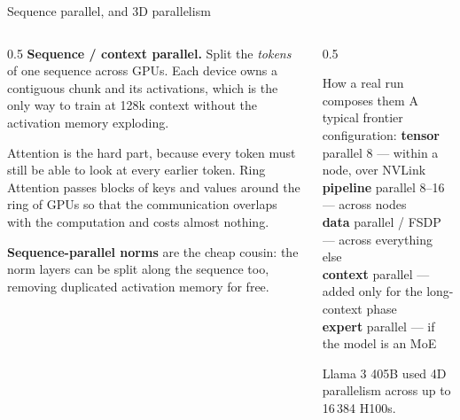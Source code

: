 \documentclass[aspectratio=169,10pt]{beamer}
\begin{document}
\begin{frame}[shrink=13]{Sequence parallel, and 3D parallelism}
  \begin{columns}[T]
    \begin{column}{0.5\textwidth}
      \textbf{Sequence / context parallel.} Split the \emph{tokens} of one
      sequence across GPUs. Each device owns a contiguous chunk and its
      activations, which is the only way to train at 128k context without the
      activation memory exploding.
      \vspace{0.4em}

      Attention is the hard part, because every token must still be able to look
      at every earlier token. Ring Attention passes blocks of keys and values
      around the ring of GPUs so that the communication overlaps with the
      computation and costs almost nothing.
      \vspace{0.5em}

      \textbf{Sequence-parallel norms} are the cheap cousin: the norm layers can
      be split along the sequence too, removing duplicated activation memory for
      free.
    \end{column}
    \begin{column}{0.5\textwidth}
      \begin{block}{How a real run composes them}
        \small
        A typical frontier configuration:
        \vspace{0.3em}
        \textbf{tensor} parallel 8 --- within a node, over NVLink\\[0.2em]
        \textbf{pipeline} parallel 8--16 --- across nodes\\[0.2em]
        \textbf{data} parallel / FSDP --- across everything else\\[0.2em]
        \textbf{context} parallel --- added only for the long-context phase\\[0.2em]
        \textbf{expert} parallel --- if the model is an MoE
      \end{block}
      \vspace{0.3em}
      \small
      Llama 3 405B used 4D parallelism across up to 16\,384 H100s.
    \end{column}
  \end{columns}
\end{frame}
\fi
\end{document}
